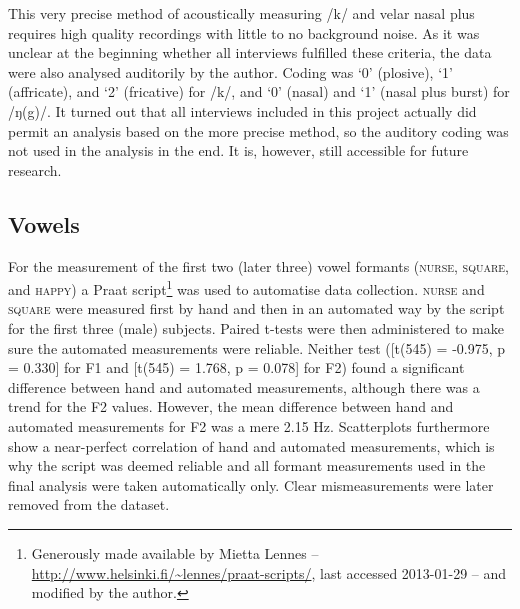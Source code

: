 	\newpage 
This very precise method of acoustically measuring /k/ and velar nasal plus requires high quality recordings with little to no background noise.
As it was unclear at the beginning whether all interviews fulfilled these criteria, the data were also analysed auditorily by the author. 
Coding was `0' (plosive), `1' (affricate), and `2' (fricative) for /k/, and `0' (nasal) and `1' (nasal plus burst) for /ŋ(g)/.
It turned out that all interviews included in this project actually did permit an analysis based on the more precise \citeauthor{sangster2001} method, so the auditory coding was not used in the analysis in the end.
It is, however, still accessible for future research.

		\subsection{Vowels}\label{sec.prod_method.vow}
		
For the measurement of the first two (later three) vowel formants (\textsc{nurse}, \textsc{square}, and \textsc{happy}) a Praat script\footnote{Generously made available by Mietta Lennes -- \url{http://www.helsinki.fi/~lennes/praat-scripts/}, last accessed 2013-01-29 -- and modified by the author.} was used to automatise data collection.
\textsc{nurse} and \textsc{square} were measured first by hand and then in an automated way by the script for the first three (male) subjects.
Paired t-tests were then administered to make sure the automated measurements were reliable. Neither test ([t(545) = -0.975, p = 0.330] for F1 and [t(545) = 1.768, p = 0.078] for F2) found a significant difference between hand and automated measurements, although there was a trend for the F2 values.
However, the mean difference between hand and automated measurements for F2 was a mere 2.15 Hz.
Scatterplots furthermore show a near-perfect correlation of hand and automated measurements, which is why the script was deemed reliable and all formant measurements used in the final analysis were taken automatically only.
Clear mismeasurements were later removed from the dataset.

